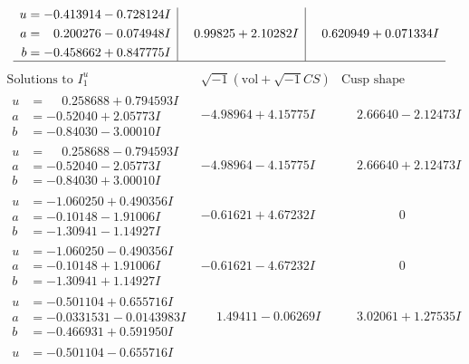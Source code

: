\documentclass[1p]{elsarticle_modified}
\theoremstyle{definition}
\newcommand{\I}{\sqrt{-1}}
\begin{document}
$$\begin{array}{c|c|c}
\begin{aligned}
u &= -0.413914 - 0.728124 I \\
a &= \phantom{-}0.200276 - 0.074948 I \\
b &= -0.458662 + 0.847775 I\end{aligned}
 & \phantom{-}0.99825 + 2.10282 I & \phantom{-}0.620949 + 0.071334 I\\
 \hline 
 \end{array}$$\newpage$$\begin{array}{c|c|c}  
\text{Solutions to }I^u_{1}& \I (\text{vol} + \sqrt{-1}CS) & \text{Cusp shape}\\
 \hline 
\begin{aligned}
u &= \phantom{-}0.258688 + 0.794593 I \\
a &= -0.52040 + 2.05773 I \\
b &= -0.84030 - 3.00010 I\end{aligned}
 & -4.98964 + 4.15775 I & \phantom{-}2.66640 - 2.12473 I \\ \hline\begin{aligned}
u &= \phantom{-}0.258688 - 0.794593 I \\
a &= -0.52040 - 2.05773 I \\
b &= -0.84030 + 3.00010 I\end{aligned}
 & -4.98964 - 4.15775 I & \phantom{-}2.66640 + 2.12473 I \\ \hline\begin{aligned}
u &= -1.060250 + 0.490356 I \\
a &= -0.10148 - 1.91006 I \\
b &= -1.30941 - 1.14927 I\end{aligned}
 & -0.61621 + 4.67232 I & \phantom{-0.000000 } 0 \\ \hline\begin{aligned}
u &= -1.060250 - 0.490356 I \\
a &= -0.10148 + 1.91006 I \\
b &= -1.30941 + 1.14927 I\end{aligned}
 & -0.61621 - 4.67232 I & \phantom{-0.000000 } 0 \\ \hline\begin{aligned}
u &= -0.501104 + 0.655716 I \\
a &= -0.0331531 - 0.0143983 I \\
b &= -0.466931 + 0.591950 I\end{aligned}
 & \phantom{-}1.49411 - 0.06269 I & \phantom{-}3.02061 + 1.27535 I \\ \hline\begin{aligned}
u &= -0.501104 - 0.655716 I \\

\end{aligned}
\end{array}$$
\end{document}
